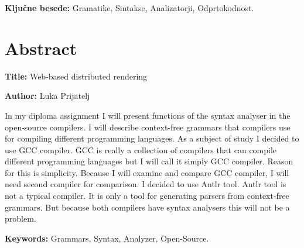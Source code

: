 \documentclass[a4paper, 12pt, tikz, border=5]{book}
\newcommand{\ttitleEn}{Web-based distributed rendering}
\newcommand{\tauthor}{Luka Prijatelj}
\newcommand{\tkeywords}{Gramatike, Sintakse, Analizatorji, Odprtokodnost}
\newcommand{\tkeywordsEn}{Grammars, Syntax, Analyzer, Open-Source}
\newcommand{\clearemptydoublepage}{\newpage{\pagestyle{empty}\cleardoublepage}}
\begin{document}
\bigskip

\noindent\textbf{Ključne besede:} \tkeywords.


\clearemptydoublepage


\chapter*{Abstract}

\noindent\textbf{Title:} \ttitleEn
\bigskip

\noindent\textbf{Author:} \tauthor
\bigskip

\noindent 
In my diploma assignment I will present functions of the syntax analyser in the open-source compilers. I will describe context-free grammars that compilers use for compiling different programming languages. As a subject of study I decided to use GCC compiler. GCC is really a collection of compilers that can compile different programming languages but I will call it simply GCC compiler. Reason for this is simplicity. 
Because I will examine and compare GCC compiler, I will need second compiler for comparison. I decided to use Antlr tool. Antlr tool is not a typical compiler. It is only a tool for generating parsers from context-free grammars. But because both compilers have syntax analysers this will not be a problem. 

\bigskip

\noindent\textbf{Keywords:} \tkeywordsEn.


\clearemptydoublepage



\mainmatter
\setcounter{page}{1}
\pagestyle{fancy}



\end{document}
